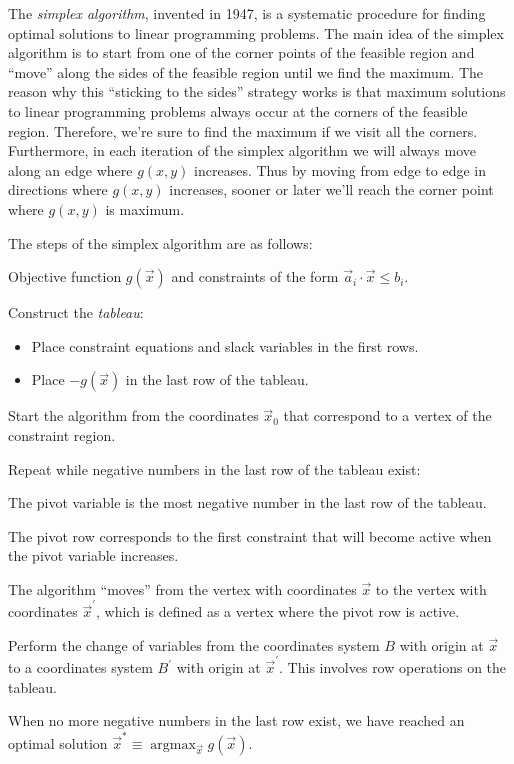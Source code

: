 \documentclass[11pt,oneside]{article}
\begin{document}
	
	The \emph{simplex algorithm}, invented in 1947, 
	is a systematic procedure for finding optimal solutions to linear programming problems.	
	The main idea of the simplex algorithm is to start from one of the corner points of the 
	feasible region and ``move'' along the sides of the feasible region until we find the maximum.
	The reason why this ``sticking to the sides'' strategy works is that maximum solutions to linear programming
	problems always occur at the corners of the feasible region.
	Therefore, we're sure to find the maximum if we visit all the corners.
	Furthermore, in each iteration of the simplex algorithm we will always move along an edge where $g(x,y)$ increases.
	Thus by moving from edge to edge in directions where $g(x,y)$ increases,
	sooner or later we'll reach the corner point where $g(x,y)$ is maximum.
	
	The steps of the simplex algorithm are as follows:
	
	\begin{description}[style=unboxed]
	\item[INPUTS:] Objective function $g(\vec{x})$ and constraints of the form $\vec{a}_i \cdot \vec{x} \leq b_i$.
	\item[SETUP:] Construct the \emph{tableau}:
		\begin{itemize}
			\item Place constraint equations and slack variables in the first rows.
			\item Place $-g(\vec{x})$ in the last row of the tableau.
		\end{itemize}
	\item[INITIALIZATION:]  Start the algorithm from the coordinates $\vec{x}_0$ that correspond 
		to a vertex of the constraint region.
	\item[MAIN LOOP:] Repeat while negative numbers in the last row of the tableau exist: 
		\begin{description}[style=unboxed]
			\item[Choose pivot variable:] The pivot variable is the most negative number in the last row of the tableau. 
			\item[Choose pivot row:] The pivot row corresponds to the first constraint that will become active when the pivot variable increases.
			\item[Move:] The algorithm ``moves'' from the vertex with coordinates $\vec{x}$ to the vertex with coordinates $\vec{x}^\prime$,
					which is defined as a vertex where the pivot row is active.
			\item[Change of variables:]	
				 Perform the change of variables from the coordinates system $B$ with origin at $\vec{x}$ 
				 to a coordinates system $B^\prime$ with origin at $\vec{x}^\prime$.
				 This involves row operations on the tableau.
		\end{description}
	\item[OUTPUT:] When no more negative numbers in the last row exist, 
		we have reached an optimal solution $\vec{x}^* \equiv \mathop{\textrm{argmax}}_{\vec{x}} g(\vec{x})$.
	
	\end{description}
	
\end{document}
